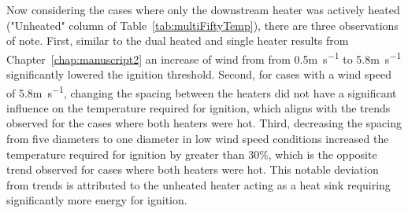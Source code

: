     Now considering the cases where only the downstream heater was actively heated ("Unheated" column of Table~\ref{tab:multiFiftyTemp}), there are three observations of note. First, similar to the dual heated and single heater results from Chapter~\ref{chap:manuscript2} an increase of wind from from 0.5\si{\meter\per\second} to 5.8\si{\meter\per\second} significantly lowered the ignition threshold. Second, for cases with a wind speed of 5.8\si{\meter\per\second}, changing the spacing between the heaters did not have a significant influence on the temperature required for ignition, which aligns with the trends observed for the cases where both heaters were hot. Third, decreasing the spacing from five diameters to one diameter in low wind speed conditions increased the temperature required for ignition by greater than 30\%, which is the opposite trend observed for cases where both heaters were hot. This notable deviation from trends is attributed to the unheated heater acting as a heat sink requiring significantly more energy for ignition. 
    
